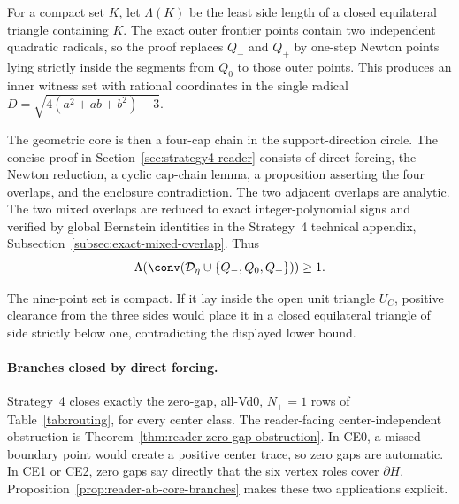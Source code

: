 For a compact set $K$, let $\Lambda(K)$ be the least side length of a closed
equilateral triangle containing $K$.  The exact outer frontier points contain
two independent quadratic radicals, so the proof replaces $Q_-$ and $Q_+$ by
one-step Newton points lying strictly inside the segments from $Q_0$ to those
outer points.  This produces an inner witness set with rational coordinates
in the single radical $D=\sqrt{4(a^2+ab+b^2)-3}$.

The geometric core is then a four-cap chain in the support-direction circle.
The concise proof in Section~\ref{sec:strategy4-reader} consists of direct
forcing, the Newton reduction, a cyclic cap-chain lemma, a proposition
asserting the four overlaps, and the enclosure contradiction.  The two
adjacent overlaps are analytic.  The two mixed overlaps are reduced to exact
integer-polynomial signs and verified by global Bernstein identities in the
Strategy~4 technical appendix, Subsection~\ref{subsec:exact-mixed-overlap}.
Thus
\[
 \Lambda\!\left(\conv(\mathcal D_\eta\cup
 \{Q_-,Q_0,Q_+\})\right)\ge1.
\]

The nine-point set is compact.  If it lay inside the open unit triangle
$U_C$, positive clearance from the three sides would place it in a closed
equilateral triangle of side strictly below one, contradicting the displayed
lower bound.

\paragraph{Branches closed by direct forcing.}
Strategy~4 closes exactly the zero-gap, all-Vd0, $N_+=1$ rows of
Table~\ref{tab:routing}, for every center class.  The reader-facing
center-independent obstruction is
Theorem~\ref{thm:reader-zero-gap-obstruction}.  In CE0, a missed boundary
point would create a positive center trace, so zero gaps are automatic.  In
CE1 or CE2, zero gaps say directly that the six vertex roles cover
$\partial H$.  Proposition~\ref{prop:reader-ab-core-branches} makes these two
applications explicit.